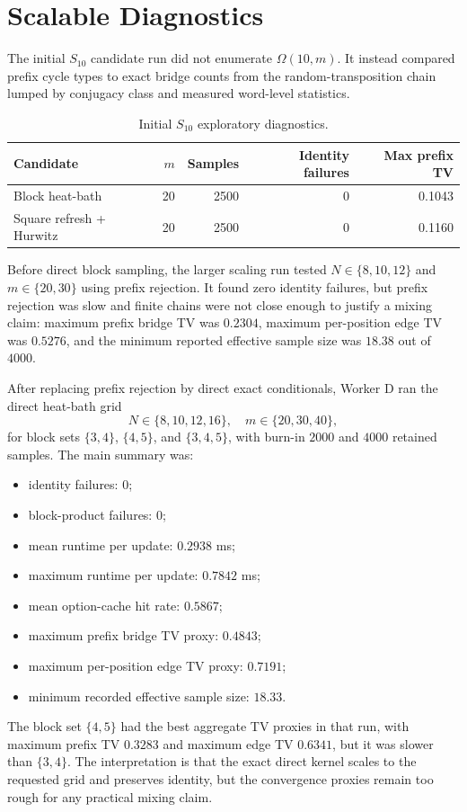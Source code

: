\section{Scalable Diagnostics}

The initial $S_{10}$ candidate run did not enumerate $\Omega(10,m)$.  It
instead compared prefix cycle types to exact bridge counts from the
random-transposition chain lumped by conjugacy class and measured word-level
statistics.

\begin{table}[ht]
\centering
\begin{tabular}{lrrrr}
\toprule
Candidate & $m$ & Samples & Identity failures & Max prefix TV \\
\midrule
Block heat-bath & 20 & 2500 & 0 & 0.1043 \\
Square refresh + Hurwitz & 20 & 2500 & 0 & 0.1160 \\
\bottomrule
\end{tabular}
\caption{Initial $S_{10}$ exploratory diagnostics.}
\label{tab:s10-initial}
\end{table}

Before direct block sampling, the larger scaling run tested
$N\in\{8,10,12\}$ and $m\in\{20,30\}$ using prefix rejection.  It found zero
identity failures, but prefix rejection was slow and finite chains were not
close enough to justify a mixing claim: maximum prefix bridge TV was $0.2304$,
maximum per-position edge TV was $0.5276$, and the minimum reported effective
sample size was $18.38$ out of $4000$.

After replacing prefix rejection by direct exact conditionals, Worker D ran the
direct heat-bath grid
\[
  N\in\{8,10,12,16\},\quad m\in\{20,30,40\},
\]
for block sets $\{3,4\}$, $\{4,5\}$, and $\{3,4,5\}$, with burn-in $2000$ and
$4000$ retained samples.  The main summary was:
\begin{itemize}
\item identity failures: $0$;
\item block-product failures: $0$;
\item mean runtime per update: $0.2938$ ms;
\item maximum runtime per update: $0.7842$ ms;
\item mean option-cache hit rate: $0.5867$;
\item maximum prefix bridge TV proxy: $0.4843$;
\item maximum per-position edge TV proxy: $0.7191$;
\item minimum recorded effective sample size: $18.33$.
\end{itemize}
The block set $\{4,5\}$ had the best aggregate TV proxies in that run, with
maximum prefix TV $0.3283$ and maximum edge TV $0.6341$, but it was slower than
$\{3,4\}$.  The interpretation is that the exact direct kernel scales to the
requested grid and preserves identity, but the convergence proxies remain too
rough for any practical mixing claim.
